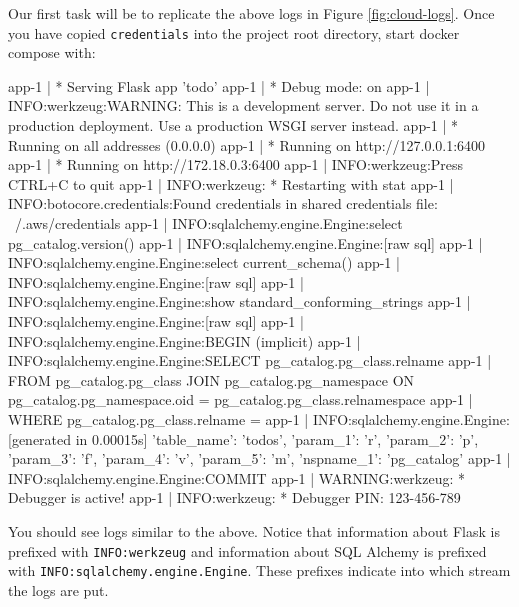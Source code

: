 \documentclass{csse4400}
\begin{document}
Our first task will be to replicate the above logs in Figure \ref{fig:cloud-logs}.
Once you have copied \texttt{credentials} into the project root directory,
start docker compose with:

\begin{code}[numbers=none]{}
app-1       |  * Serving Flask app 'todo'
app-1       |  * Debug mode: on
app-1       | INFO:werkzeug:WARNING: This is a development server. Do not use it in a production deployment. Use a production WSGI server instead.
app-1       |  * Running on all addresses (0.0.0.0)
app-1       |  * Running on http://127.0.0.1:6400
app-1       |  * Running on http://172.18.0.3:6400
app-1       | INFO:werkzeug:Press CTRL+C to quit
app-1       | INFO:werkzeug: * Restarting with stat
app-1       | INFO:botocore.credentials:Found credentials in shared credentials file: ~/.aws/credentials
app-1       | INFO:sqlalchemy.engine.Engine:select pg_catalog.version()
app-1       | INFO:sqlalchemy.engine.Engine:[raw sql] {}
app-1       | INFO:sqlalchemy.engine.Engine:select current_schema()
app-1       | INFO:sqlalchemy.engine.Engine:[raw sql] {}
app-1       | INFO:sqlalchemy.engine.Engine:show standard_conforming_strings
app-1       | INFO:sqlalchemy.engine.Engine:[raw sql] {}
app-1       | INFO:sqlalchemy.engine.Engine:BEGIN (implicit)
app-1       | INFO:sqlalchemy.engine.Engine:SELECT pg_catalog.pg_class.relname
app-1       | FROM pg_catalog.pg_class JOIN pg_catalog.pg_namespace ON pg_catalog.pg_namespace.oid = pg_catalog.pg_class.relnamespace
app-1       | WHERE pg_catalog.pg_class.relname = %
app-1       | INFO:sqlalchemy.engine.Engine:[generated in 0.00015s] {'table_name': 'todos', 'param_1': 'r', 'param_2': 'p', 'param_3': 'f', 'param_4': 'v', 'param_5': 'm', 'nspname_1': 'pg_catalog'}
app-1       | INFO:sqlalchemy.engine.Engine:COMMIT
app-1       | WARNING:werkzeug: * Debugger is active!
app-1       | INFO:werkzeug: * Debugger PIN: 123-456-789
\end{code}

You should see logs similar to the above.
Notice that information about Flask is prefixed with \texttt{INFO:werkzeug} and information about SQL Alchemy is prefixed with \texttt{INFO:sqlalchemy.engine.Engine}.
These prefixes indicate into which stream the logs are put.
\end{document}
